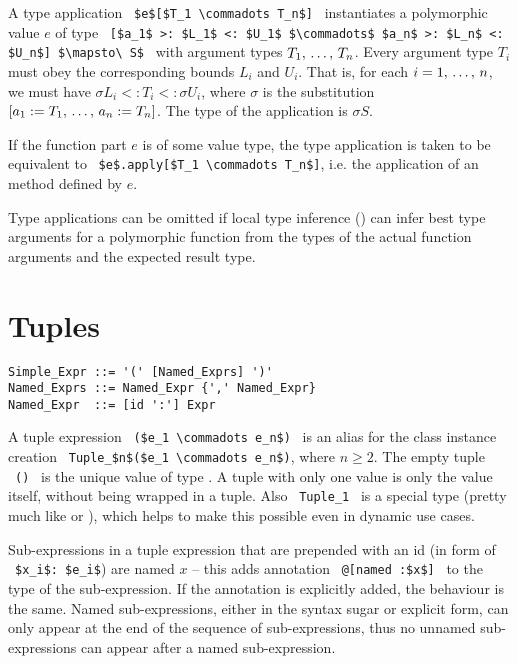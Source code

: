 A type application ~\lstinline!$e$[$T_1 \commadots T_n$]!~ instantiates a polymorphic value $e$ of type ~\lstinline![$a_1$ >: $L_1$ <: $U_1$ $\commadots$ $a_n$ >: $L_n$ <: $U_n$] $\mapsto\ S$!~ with argument types $T_1 ,\, \ldots ,\, T_n$. Every argument type $T_i$ must obey the corresponding bounds $L_i$ and $U_i$. That is, for each $i = 1 ,\, \ldots ,\, n$, we must have $\sigma L_i <: T_i <: \sigma U_i$, where $\sigma$ is the substitution $[a_1 := T_1 ,\, \ldots ,\, a_n := T_n]$. The type of the application is $\sigma S$. 

If the function part $e$ is of some value type, the type application is taken to be equivalent to ~\lstinline!$e$.apply[$T_1 \commadots T_n$]!, i.e. the application of an  method defined by $e$. 

Type applications can be omitted if local type inference () can infer best type arguments for a polymorphic function from the types of the actual function arguments and the expected result type. 





\section{Tuples}
\label{sec:tuples}

\syntax\begin{lstlisting}
Simple_Expr ::= '(' [Named_Exprs] ')'
Named_Exprs ::= Named_Expr {',' Named_Expr}
Named_Expr  ::= [id ':'] Expr
\end{lstlisting}

A tuple expression ~\lstinline!($e_1 \commadots e_n$)!~ is an alias for the class instance creation ~\lstinline!Tuple_$n$($e_1 \commadots e_n$)!, where $n \geq 2$. The empty tuple ~\lstinline!()!~ is the unique value of type . A tuple with only one value is only the value itself, without being wrapped in a tuple. Also ~\lstinline!Tuple_1!~ is a special type (pretty much like  or ), which helps to make this possible even in dynamic use cases. 

Sub-expressions in a tuple expression that are prepended with an id (in form of ~\lstinline!$x_i$: $e_i$!) are named $x$ -- this adds annotation ~\lstinline!@[named :$x$]!~ to the type of the sub-expression. If the annotation is explicitly added, the behaviour is the same. Named sub-expressions, either in the syntax sugar or explicit form, can only appear at the end of the sequence of sub-expressions, thus no unnamed sub-expressions can appear after a named sub-expression. 






